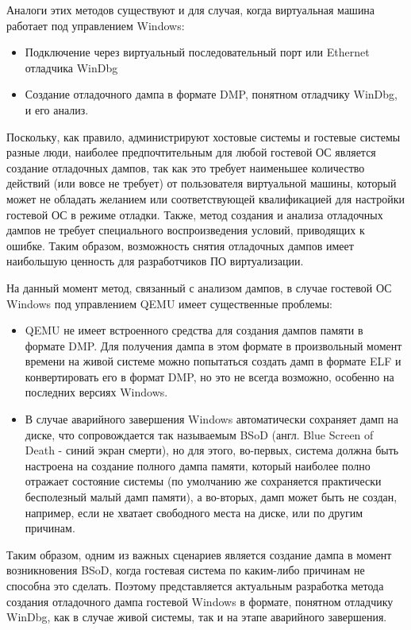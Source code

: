 \documentclass{mipt-thesis-bs}
\begin{document}
Аналоги этих методов существуют и для случая, когда виртуальная машина работает под управлением Windows:

\begin{itemize}
\item Подключение через виртуальный последовательный порт или Ethernet отладчика WinDbg
\item Создание отладочного дампа в формате DMP, понятном отладчику WinDbg, и его анализ.
\end{itemize}

Поскольку, как правило, администрируют хостовые системы и гостевые системы разные люди, наиболее предпочтительным для любой гостевой ОС является создание отладочных дампов, так как это требует наименьшее количество действий (или вовсе не требует) от пользователя виртуальной машины, который может не обладать желанием или соответствующей квалификацией для настройки гостевой ОС в режиме отладки. Также, метод создания и анализа отладочных дампов не требует специального воспроизведения условий, приводящих к ошибке. Таким образом, возможность снятия отладочных дампов имеет наибольшую ценность для разработчиков ПО виртуализации.

На данный момент метод, связанный с анализом дампов, в случае гостевой ОС Windows под управлением QEMU имеет существенные проблемы:

\begin{itemize}
\item QEMU не имеет встроенного средства для создания дампов памяти в формате DMP. Для получения дампа в этом формате в произвольный момент времени на живой системе можно попытаться создать дамп в формате ELF и конвертировать его в формат DMP, но это не всегда возможно, особенно на последних версиях Windows.
\item В случае аварийного завершения Windows автоматически сохраняет дамп на диске, что сопровождается так называемым BSoD (англ. Blue Screen of Death - синий экран смерти), но для этого, во-первых, система должна быть настроена на создание полного дампа памяти, который наиболее полно отражает состояние системы (по умолчанию же сохраняется практически бесполезный малый дамп памяти), а во-вторых, дамп может быть не создан, например, если не хватает свободного места на диске, или по другим причинам\cite{nodump}.
\end{itemize}

Таким образом, одним из важных сценариев является создание дампа в момент возникновения BSoD, когда гостевая система по каким-либо причинам не способна это сделать. Поэтому представляется актуальным разработка метода создания отладочного дампа гостевой Windows в формате, понятном отладчику WinDbg, как в случае живой системы, так и на этапе аварийного завершения.
\end{document}
